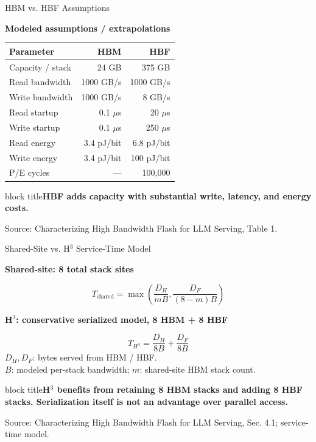 \documentclass[aspectratio=169,10pt]{beamer}
\newif\ifbackup
\newcommand{\takeaway}[1]{\par\vspace{.12cm}\begin{beamercolorbox}[rounded=true,sep=.12cm,wd=\linewidth]{block title}\small\bfseries #1\end{beamercolorbox}}
\newcommand{\src}[1]{\par\vfill{\fontsize{7}{8}\selectfont\color{Muted}Source: Characterizing High Bandwidth Flash for LLM Serving, #1.}\par}
\newcommand{\head}[1]{\par{\color{Accent}\bfseries #1}\par\smallskip}
\begin{document}
\appendix
\backuptrue
\begin{frame}[t]{HBM vs. HBF Assumptions}

\head{Modeled assumptions / extrapolations}
\begin{center}
\setlength{\tabcolsep}{9pt}\begin{tabular}{lrr}\toprule Parameter&HBM&HBF\\\midrule
Capacity / stack&24 GB&375 GB\\
Read bandwidth&1000 GB/s&1000 GB/s\\
Write bandwidth&1000 GB/s&8 GB/s\\
Read startup&0.1 $\mu$s&20 $\mu$s\\
Write startup&0.1 $\mu$s&250 $\mu$s\\
Read energy&3.4 pJ/bit&6.8 pJ/bit\\
Write energy&3.4 pJ/bit&100 pJ/bit\\
P/E cycles&---&100,000\\\bottomrule
\end{tabular}\end{center}
\takeaway{HBF adds capacity with substantial write, latency, and energy costs.}

\src{Table 1}
\end{frame}

\begin{frame}[t]{Shared-Site vs. H$^3$ Service-Time Model}

\head{Shared-site: 8 total stack sites}
\[T_{\mathrm{shared}}=\max\left(\frac{D_H}{mB},\frac{D_F}{(8-m)B}\right)\]
\head{H$^3$: conservative serialized model, 8 HBM + 8 HBF}
\[T_{H^3}=\frac{D_H}{8B}+\frac{D_F}{8B}\]
\vspace{.2cm}
$D_H,D_F$: bytes served from HBM / HBF.\\
$B$: modeled per-stack bandwidth; $m$: shared-site HBM stack count.
\takeaway{H$^3$ benefits from retaining 8 HBM stacks and adding 8 HBF stacks. Serialization itself is not an advantage over parallel access.}

\src{Sec. 4.1; service-time model}
\end{frame}
\end{document}
